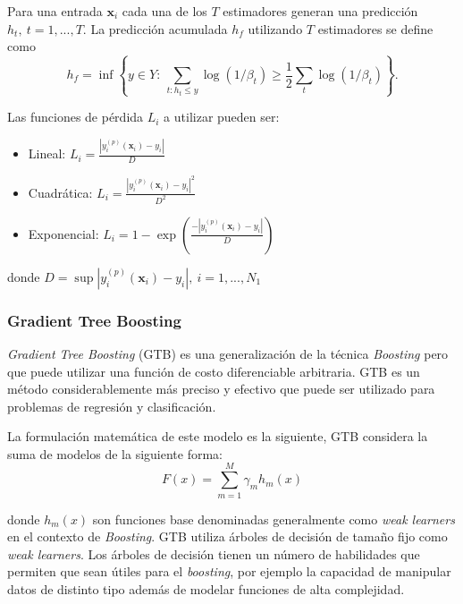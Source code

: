 \documentclass[spanish]{article}
\begin{document}
          Para una entrada $\textbf{x}_i$ cada una de los $T$ estimadores generan una predicción 
          $h_t, ~ t=1, ..., T$. La predicción acumulada $h_f$ utilizando $T$ estimadores se define como
          \begin{equation}
            h_f = \inf \left\{y\in Y: ~ \sum_{t:h_t\leq y} \log(1/\beta_t) \geq \frac12 \sum_{t} \log(1/\beta_t) \right\}.
          \end{equation}
          
          Las funciones de pérdida $L_i$ a utilizar pueden ser:
          \begin{itemize}
            \item Lineal: $L_i=\frac{|y_i^{(p)}(\textbf{x}_i)-y_i|}{D}$
            \item Cuadrática: $L_i=\frac{|y_i^{(p)}(\textbf{x}_i)-y_i|^2}{D^2}$
            \item Exponencial: $L_i=1- \exp\left(\frac{-|y_i^{(p)}(\textbf{x}_i)-y_i|}{D}\right)$
          \end{itemize}
          
          donde $D=\sup|y_i^{(p)}(\textbf{x}_i)-y_i|, ~ i=1, ..., N_1$
                
            
        \subsubsection{Gradient Tree Boosting}
        
          \emph{Gradient Tree Boosting} (GTB) \cite{friedman2001greedy} es una generalización de la técnica \emph{Boosting} pero que 
          puede utilizar una función de costo diferenciable arbitraria. GTB es un método considerablemente 
          más preciso y efectivo que puede ser utilizado para problemas de regresión
          y clasificación. \medskip
          
          La formulación matemática de este modelo es la siguiente, GTB considera la suma de modelos de 
          la siguiente forma:
          \begin{equation}
            F(x) = \sum_{m=1}^{M} \gamma_m h_m(x)
          \end{equation}
          
          donde $h_m(x)$ son funciones base denominadas generalmente como \emph{weak learners} en el 
          contexto de \emph{Boosting}. GTB utiliza árboles de decisión de tamaño fijo como \emph{weak learners}. 
          Los árboles de decisión tienen un número de habilidades que permiten que sean útiles para 
          el \emph{boosting}, por ejemplo la capacidad de manipular datos de distinto tipo además de 
          modelar funciones de alta complejidad. \medskip
\end{document}
